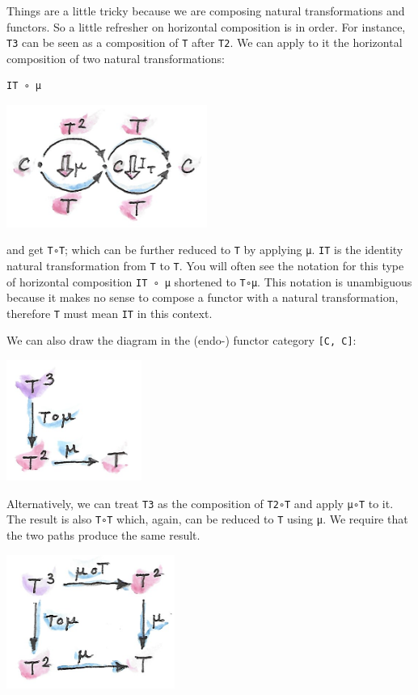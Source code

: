 Things are a little tricky because we are composing natural
transformations and functors. So a little refresher on horizontal
composition is in order. For instance, \texttt{T3} can be seen as a
composition of \texttt{T} after \texttt{T2}. We can apply to it the
horizontal composition of two natural transformations:

\begin{verbatim}
IT ∘ μ
\end{verbatim}

\includegraphics[width=2.58333in]{images/assoc1.png}

and get \texttt{T∘T}; which can be further reduced to \texttt{T} by
applying \texttt{μ}. \texttt{IT} is the identity natural transformation
from \texttt{T} to \texttt{T}. You will often see the notation for this
type of horizontal composition \texttt{IT\ ∘\ μ} shortened to
\texttt{T∘μ}. This notation is unambiguous because it makes no sense to
compose a functor with a natural transformation, therefore \texttt{T}
must mean \texttt{IT} in this context.

We can also draw the diagram in the (endo-) functor category
\texttt{{[}C,\ C{]}}:

\includegraphics[width=1.73958in]{images/assoc2.png}

Alternatively, we can treat \texttt{T3} as the composition of
\texttt{T2∘T} and apply \texttt{μ∘T} to it. The result is also
\texttt{T∘T} which, again, can be reduced to \texttt{T} using μ. We
require that the two paths produce the same result.

\includegraphics[width=2.16667in]{images/assoc.png}

